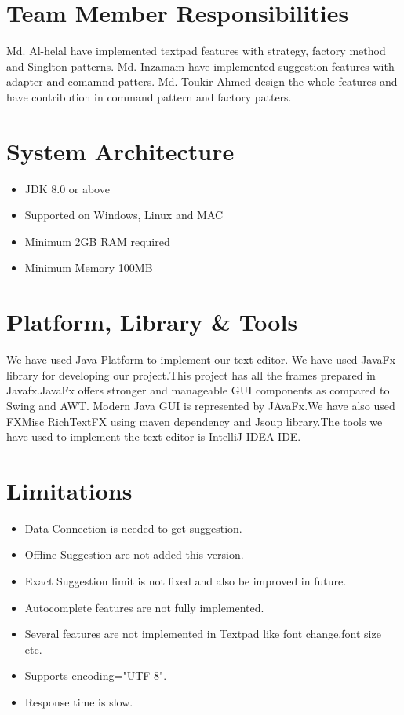 \documentclass[a4paper]{article}
\begin{document}
\section{}
\section{Team Member Responsibilities}
Md. Al-helal have implemented textpad features with strategy, factory method and Singlton patterns.
Md. Inzamam have implemented suggestion features with adapter and comamnd patters.
Md. Toukir Ahmed design the whole features and have contribution in command pattern and factory patters.
\section{System Architecture}
\begin{itemize}
\item JDK 8.0 or above
\item Supported on Windows, Linux and MAC
\item Minimum 2GB RAM required
\item Minimum Memory 100MB  
\end{itemize}
\section{Platform, Library \& Tools}
We have used Java Platform to implement our text editor. We have used JavaFx library for developing our project.This project has all the frames prepared in Javafx.JavaFx offers stronger and manageable GUI components as compared to Swing and AWT. Modern Java GUI is represented by JAvaFx.We have also used FXMisc RichTextFX using maven dependency and Jsoup library.The tools we have used to implement the text editor is IntelliJ IDEA IDE. 
\section{Limitations}
\begin{itemize}
\item Data Connection is  needed to get suggestion.
\item Offline Suggestion are not added this version.
\item Exact Suggestion limit is not fixed and also be improved in future.
\item Autocomplete features are not fully implemented.
\item Several features are not implemented in Textpad like font change,font size etc.
\item Supports encoding="UTF-8".
\item Response time is slow.
\end{itemize}
\end{document}
